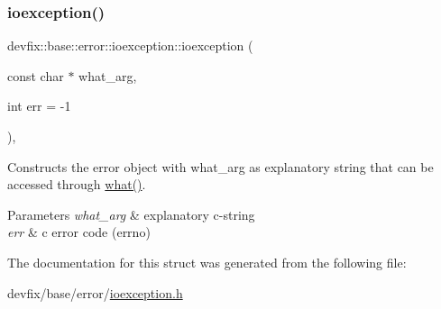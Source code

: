 \subsubsection{\texorpdfstring{ioexception()}{ioexception()}\hspace{0.1cm}{\footnotesize\ttfamily [2/2]}}
{\footnotesize\ttfamily devfix\+::base\+::error\+::ioexception\+::ioexception (\begin{DoxyParamCaption}\item[{const char $\ast$}]{what\+\_\+arg,  }\item[{int}]{err = {\ttfamily -\/1} }\end{DoxyParamCaption})\hspace{0.3cm}{\ttfamily [inline]}, {\ttfamily [explicit]}}

Constructs the error object with what\+\_\+arg as explanatory string that can be accessed through \hyperlink{structdevfix_1_1base_1_1error_1_1baseexception_a16327152a55d65b1e537825231fbd452}{what()}. 
\begin{DoxyParams}{Parameters}
{\em what\+\_\+arg} & explanatory c-\/string \\
\hline
{\em err} & c error code (errno) \\
\hline
\end{DoxyParams}


The documentation for this struct was generated from the following file\+:\begin{DoxyCompactItemize}
\item 
devfix/base/error/\hyperlink{ioexception_8h}{ioexception.\+h}\end{DoxyCompactItemize}
